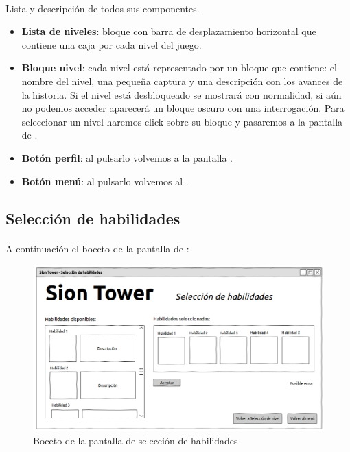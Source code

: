 \paragraph{}
Lista y descripción de todos sus componentes.

\begin{itemize}
    \item \textbf{Lista de niveles}: bloque con barra de desplazamiento
    horizontal que contiene una caja por cada nivel del juego.
    \item \textbf{Bloque nivel}: cada nivel está representado por un bloque
    que contiene: el nombre del nivel, una pequeña captura y una descripción con
    los avances de la historia. Si el nivel está desbloqueado se mostrará
    con normalidad, si aún no podemos acceder aparecerá un bloque oscuro
    con una interrogación. Para seleccionar un nivel haremos click sobre su
    bloque y pasaremos a la pantalla de \selhabilidad.
    \item \textbf{Botón perfil}: al pulsarlo volvemos a la pantalla \selperfil.
    \item \textbf{Botón menú}: al pulsarlo volvemos al \menu.
\end{itemize}

\clearpage

\subsection{Selección de habilidades}
\label{sec:ui-habilidades}

\paragraph{}
A continuación el boceto de la pantalla de \selhabilidad:

\begin{figure}[H]
    \centering
        \includegraphics[width=\textwidth]{img/sel-hab.png} 
    \caption{Boceto de la pantalla de selección de habilidades}
    \label{img:sel-hab}
\end{figure}


